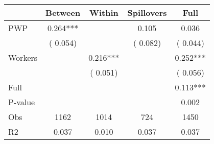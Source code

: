 
\begin{tabular}{l*{4}{c}}\hline&\multicolumn{1}{c}{Between}&\multicolumn{1}{c}{Within}&\multicolumn{1}{c}{Spillovers}&\multicolumn{1}{c}{Full}\\ \hline
 PWP           &              0.264***      &                                               &        0.105 &         0.036                            \\ 
                               &        (       0.054)           &                                       &       (       0.082)     &      (       0.044)                                           \\ 
 Workers       &                                               &        0.216***    &                                &             0.252***                            \\ 
                               &                                               & (       0.051)                  &                                        &      (       0.056)                                           \\ 
\hline                                                                                                                                                                                                                                            
 Full                  &                                               &                                               &                                        &             0.113***                                     \\ 
 P-value               &                                               &                                               &                                        &             0.002                                           \\ 
 Obs                   &               1162               &       1014                       &       724                &              1450                                               \\ 
 R2                    &                      0.037              &              0.010                      &              0.037               &                     0.037                                              \\ 
\hline \end{tabular}                                                                                                                                                                                                              